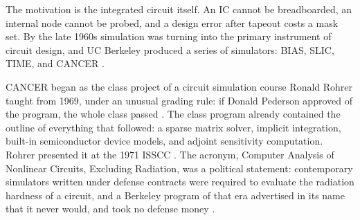 \documentclass[11pt]{article}
\begin{document}
\begin{center}
\end{center}

The motivation is the integrated circuit itself. An IC cannot be
breadboarded, an internal node cannot be probed, and a design error after
tapeout costs a mask set. By the late 1960s simulation was turning into
the primary instrument of circuit design, and UC Berkeley produced a
series of simulators: BIAS, SLIC, TIME, and CANCER \cite{lifeofspice}.

CANCER began as the class project of a circuit simulation course Ronald
Rohrer taught from 1969, under an unusual grading rule: if Donald
Pederson approved of the program, the whole class passed
\cite{lifeofspice}. The class program already contained the outline of
everything that followed: a sparse matrix solver, implicit integration,
built-in semiconductor device models, and adjoint sensitivity
computation. Rohrer presented it at the 1971 ISSCC \cite{cancer}. The
acronym, Computer Analysis of Nonlinear Circuits, Excluding Radiation,
was a political statement: contemporary simulators written under defense
contracts were required to evaluate the radiation hardness of a circuit,
and a Berkeley program of that era advertised in its name that it never
would, and took no defense money \cite{lifeofspice}.
\end{document}
